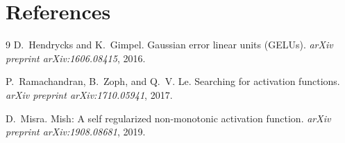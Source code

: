 \documentclass[11pt]{article}
\begin{document}
\section{References}
\label{sec:references}

\begin{thebibliography}{9}
D.~Hendrycks and K.~Gimpel.
\newblock Gaussian error linear units (GELUs).
\newblock \emph{arXiv preprint arXiv:1606.08415}, 2016.

P.~Ramachandran, B.~Zoph, and Q.~V. Le.
\newblock Searching for activation functions.
\newblock \emph{arXiv preprint arXiv:1710.05941}, 2017.

D.~Misra.
\newblock Mish: A self regularized non-monotonic activation function.
\newblock \emph{arXiv preprint arXiv:1908.08681}, 2019.
\end{thebibliography}
\end{document}
